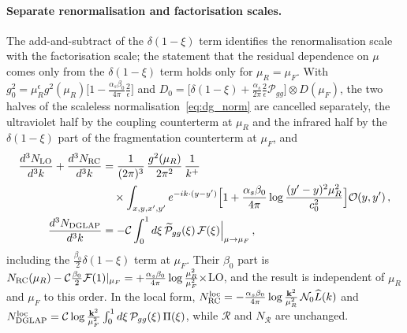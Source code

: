 \paragraph{Separate renormalisation and factorisation scales.} The add-and-subtract of the $\delta(1-\xi)$ term identifies the renormalisation scale with the factorisation scale; the statement that the residual dependence on $\mu$ comes only from the $\delta(1-\xi)$ term holds only for $\mu_R=\mu_F$. With $g_0^2=\mu_R^\epsilon g^2(\mu_R)\big[1-\frac{\alpha_s\beta_0}{4\pi}\frac2\epsilon\big]$ and $D_0=\big[\delta(1-\xi)+\frac{\alpha_s}{2\pi}\frac2\epsilon\mathcal P_{gg}\big]\otimes D(\mu_F)$, the two halves of the scaleless normalisation~\eqref{eq:dg_norm} are cancelled separately, the ultraviolet half by the coupling counterterm at $\mu_R$ and the infrared half by the $\delta(1-\xi)$ part of the fragmentation counterterm at $\mu_F$, and
\begin{align}\label{eq:dg_muRmuF}
\frac{d^3N_{\rm LO}}{d^3k}+\frac{d^3N_{\rm RC}}{d^3k}&=\frac{1}{(2\pi)^3}\,\frac{g^2(\mu_R)}{2\pi^2}\,\frac{1}{k^+}\notag\\&\quad\times\int_{x,y,x',y'}e^{-ik\cdot(y-y')}\Big[1+\frac{\alpha_s\beta_0}{4\pi}\log\frac{(y'-y)^2\mu_R^2}{c_0^2}\Big]\mathcal O(y,y')\,,\notag\\
\frac{d^3N_{\rm DGLAP}}{d^3k}&=-\mathcal C\int_0^1d\xi\,\widetilde{\mathcal P}_{gg}(\xi)\,\mathcal F(\xi)\Big|_{\mu\to\mu_F}\,,
\end{align}
including the $\frac{\beta_0}{2}\delta(1-\xi)$ term at $\mu_F$. Their $\beta_0$ part is $N_{\rm RC}(\mu_R)-\mathcal C\frac{\beta_0}{2}\mathcal F(1)|_{\mu_F}=+\frac{\alpha_s\beta_0}{4\pi}\log\frac{\mu_R^2}{\mu_F^2}\times$LO, and the result is independent of $\mu_R$ and $\mu_F$ to this order. In the local form, $N^{\rm loc}_{\rm RC}=-\frac{\alpha_s\beta_0}{4\pi}\log\frac{\mathbf{k}^2}{\mu_R^2}\,\mathcal N_0\widehat L(k)$ and $N^{\rm loc}_{\rm DGLAP}=\mathcal C\log\frac{\mathbf{k}^2}{\mu_F^2}\int_0^1d\xi\,\mathcal P_{gg}(\xi)\,\Pi(\xi)$, while $\mathcal R$ and $N_{\mathcal R}$ are unchanged.

